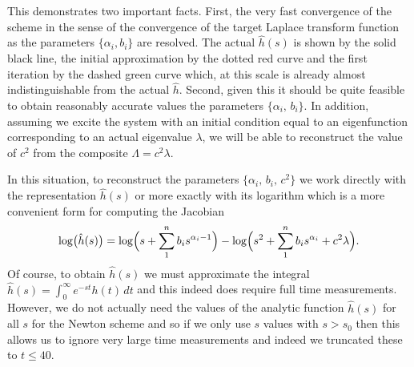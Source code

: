 This demonstrates two important facts.
First, the very fast convergence of the scheme in the sense of the
convergence of the target Laplace transform function as the parameters
$\{\alpha_i,b_i\}$ are resolved.
The actual $\hat{h}(s)$ is shown by the solid black line, the initial approximation
by the dotted red curve and the first iteration by the dashed green curve
which, at this scale is already almost indistinguishable from the actual $\hat{h}$.
Second, given this it should be quite feasible to obtain reasonably
accurate values the parameters $\{\alpha_i,\,b_i\}$.
In addition, assuming we excite the system with an initial condition
equal to an eigenfunction corresponding to an actual eigenvalue $\lambda$,
we will be able to reconstruct the value of $c^2$ from 
the composite $\Lambda=c^2\lambda$. %

\smallskip
In this situation, to reconstruct the parameters $\{\alpha_i,\,b_i,\, c^2\}$
we work directly with the representation $\hat{h}(s)$ or more exactly with its
logarithm which is a more convenient form for computing the Jacobian
\begin{equation}\label{eqn:log_F(s)}
\log\bigl(\hat{h}(s)\bigr) =
\log\Bigl( s + \sum_1^n b_i s^{\alpha_i-1}\Bigr) -
\log\Bigl( s^2 + \sum_1^n b_i s^{\alpha_i} + c^2\lambda\Bigr).
\end{equation}
Of course, to obtain $\hat{h}(s)$ we must approximate
the integral $\hat{h}(s) = \int_0^\infty e^{-st}h(t)\,dt$ and this indeed does
require full time measurements.
However, we do not actually need the values of the analytic function
$\hat{h}(s)$ for all $s$ for the Newton scheme and so if we only use $s$
values with $s>s_0$ then this allows us to ignore very large time measurements
and indeed we truncated these to $t\leq 40$.

